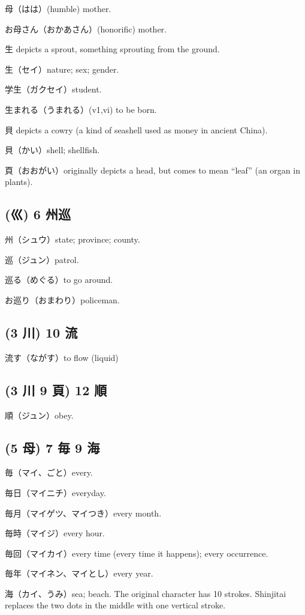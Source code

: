 母（はは）(humble) mother.

お母さん（おかあさん）(honorific) mother.

生 depicts a sprout, something sprouting from the ground.

生（セイ）nature; sex; gender.

学生（ガクセイ）student.

生まれる（うまれる）(v1,vi) to be born.

貝 depicts a cowry (a kind of seashell used as money in ancient China).

貝（かい）shell; shellfish.

頁（おおがい）originally depicts a head,
but comes to mean ``leaf'' (an organ in plants).

\subsection{(巛) 6 州巡}

州（シュウ）state; province; county.

巡（ジュン）patrol.

巡る（めぐる）to go around.

お巡り（おまわり）policeman.

\subsection{(3 川) 10 流}

流す（ながす）to flow (liquid)

\subsection{(3 川 9 頁) 12 順}

順（ジュン）obey.

\subsection{(5 母) 7 毎 9 海}

毎（マイ、ごと）every.

毎日（マイニチ）everyday.

毎月（マイゲツ、マイつき）every month.

毎時（マイジ）every hour.

毎回（マイカイ）every time (every time it happens); every occurrence.

毎年（マイネン、マイとし）every year.

海（カイ、うみ）sea; beach.
The original character has 10 strokes.
Shinjitai replaces the two dots in the middle
with one vertical stroke.

